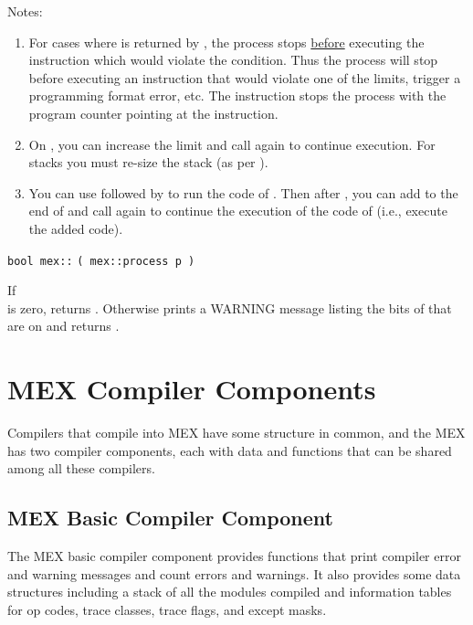 \documentclass[12pt]{article}
\begin{document}
Notes:
\begin{enumerate}
\item For cases where  is returned by ,
the process stops \underline{before} executing the instruction which
would violate the condition.
Thus the process will stop before executing an instruction that would
violate one of the limits, trigger a programming format error, etc.
The  instruction stops the process with the program counter
pointing at the  instruction.
\item \label{LIMIT-STOP-NOTE}
On , you can increase the limit
and call  again to continue execution.
For stacks you must re-size the stack (as per ).
\item You can use  followed by 
to run the code of .  Then after ,
you can add to the end of 
and call  again to continue the execution of the code
of  (i.e., execute the added code).
\end{enumerate}

{\tt bool mex::} \verb|( mex::process p )|%
\label{MEX::EXCEPTS_CHECK}
\begin{indpar}
If \hspace*{0.5in}
 \\
is zero,
returns .  Otherwise prints a WARNING message listing
the bits of  that are on and returns .
\end{indpar}

\section{MEX Compiler Components}
\label{MEX-COMPILER-COMPONENTS}

Compilers that compile into MEX have some structure in common,
and the MEX has two compiler components, each with data and
functions that can be shared among all these compilers.

\subsection{MEX Basic Compiler Component}
\label{MEX-BASIC-COMPILER-COMPONENT}

The MEX basic compiler component provides functions that print
compiler error and warning messages and count errors and warnings.
It also provides some data structures including a stack of all the
modules compiled and information tables for op codes, trace classes,
trace flags, and except masks.
\end{document}
